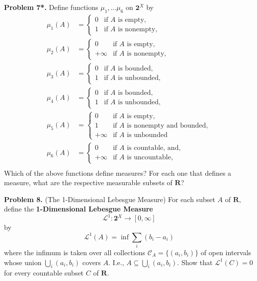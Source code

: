 \documentclass[10pt]{article}
\begin{document}
	\noindent \textbf{Problem 7*.} Define functions $\mu_1, \dots \mu_6$ on $\mathbf{2}^X$ by
		\begin{align*}
			\mu_1(A) &= \begin{cases}
				0 & \text{if } A \text{ is empty}, \\
				1 & \text{if } A \text{ is nonempty}, 
			\end{cases} \\
			\mu_2(A) &= \begin{cases}
				0 & \text{if } A \text{ is empty}, \\
				+\infty & \text{if } A \text{ is nonempty}, 
			\end{cases} \\
			\mu_3(A) &= \begin{cases}
				0 & \text{if } A \text{ is bounded}, \\
				1 & \text{if } A \text{ is unbounded}, 
			\end{cases} \\
			\mu_4(A) &= \begin{cases}
				0 & \text{if } A \text{ is bounded}, \\
				1 & \text{if } A \text{ is unbounded}, 
			\end{cases} \\
			\mu_5(A) &= \begin{cases}
				0 & \text{if } A \text{ is empty}, \\
				1 & \text{if } A \text{ is nonempty and bounded}, \\
				+\infty &\text{if } A \text{ is unbounded}
			\end{cases} \\
			\mu_6(A) &= \begin{cases}
				0 & \text{if } A \text{ is countable, and}, \\
				+\infty & \text{if } A \text{ is uncountable}, 
			\end{cases} \\
		\end{align*}
	Which of the above functions define measures? For each one that defines a measure, what are the respective measurable subsets of $\mathbf{R}$? 
	
	\vspace{20pt}
	
	\noindent \textbf{Problem 8.} (The 1-Dimensional Lebesgue Measure) For each subset $A$ of $\mathbf{R}$, define the \textbf{1-Dimensional Lebesgue Measure} $$\mathcal{L}^1: \mathbf{2}^X \to [0, \infty]$$ by $$\mathcal{L}^1(A) = \inf \sum_i (b_i - a_i)$$ where the infimum is taken over all collections $\mathcal{C}_A = \{(a_i, b_i)\}$ of open intervals whose union $\bigcup_i (a_i, b_i)$ covers $A$. I.e., $A \subseteq \bigcup_i (a_i, b_i)$. Show that $\mathcal{L}^1(C) = 0$ for every countable subset $C$ of $\mathbf{R}$. 
	
\end{document}

